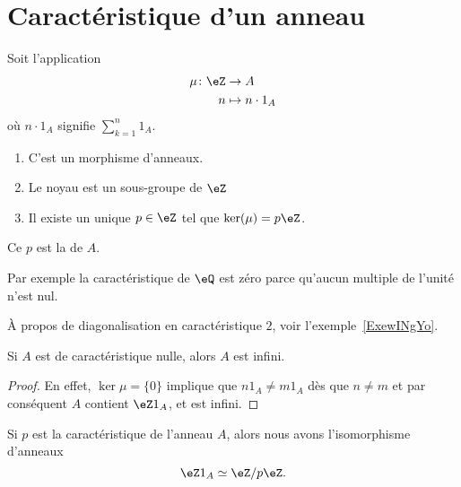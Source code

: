 \section{Caractéristique d'un anneau}

\begin{lemmaDef}        \label{LEMDEFooVEWZooUrPaDw}
	Soit l'application
	\begin{equation}
		\begin{aligned}
			\mu\colon \eZ & \to A              \\
			n             & \mapsto n\cdot 1_A
		\end{aligned}
	\end{equation}
	où \( n\cdot 1_A\) signifie \( \sum_{k=1}^n1_A\).
	\begin{enumerate}
		\item
		      C'est un morphisme d'anneaux.
		\item
		      Le noyau est un sous-groupe de \( \eZ\)
		\item
		      Il existe un unique \( p\in \eZ\) tel que \( \ker(\mu)=p\eZ\).
	\end{enumerate}
	Ce \( p\) est la  de \( A\).
\end{lemmaDef}

Par exemple la caractéristique de \( \eQ\) est zéro parce qu'aucun multiple de l'unité n'est nul.

À propos de diagonalisation en caractéristique \( 2\), voir l'exemple~\ref{ExewINgYo}.

\begin{lemma}
	Si \( A\) est de caractéristique nulle, alors \( A\) est infini.
\end{lemma}

\begin{proof}
	En effet, \( \ker\mu=\{0\} \) implique que \( n1_A \neq  m1_A\) dès que \(n \neq m \) et par conséquent \( A\) contient \(\eZ 1_A \), et  est infini.
\end{proof}

\begin{lemma}       \label{LemHmDaYH}
	Si \( p\) est la caractéristique de l'anneau \( A\), alors nous avons l'isomorphisme d'anneaux
	\begin{equation}
		\eZ 1_A\simeq\eZ/p\eZ.
	\end{equation}
\end{lemma}

